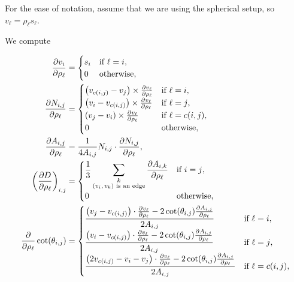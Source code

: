 For the ease of notation, assume that we are using the spherical setup, so \(v_\ell = \rho_\ell s_\ell\).

We compute

\begin{align*}
	\frac{\partial v_i}{\partial \rho_\ell} &= \begin{cases}
		s_i & \text{if \(\ell = i\)}, \\
		0 & \text{otherwise},
	\end{cases} \\
	\frac{\partial N_{i, j}}{\partial \rho_\ell} &= \begin{cases}
		\pof{v_{c\pof{i, j}} - v_j} \times \frac{\partial v_\ell}{\partial \rho_\ell} & \text{if \(\ell = i\)}, \\
		\pof{v_i - v_{c\pof{i, j}}} \times \frac{\partial v_\ell}{\partial \rho_\ell} & \text{if \(\ell = j\)}, \\
		\pof{v_j - v_i} \times \frac{\partial v_\ell}{\partial \rho_\ell} & \text{if \(\ell = c\pof{i, j}\)}, \\
		0 & \text{otherwise},
	\end{cases} \\
	\frac{\partial A_{i, j}}{\partial \rho_\ell} &= \frac{1}{4A_{i, j}}N_{i, j} \cdot \frac{\partial N_{i, j}}{\partial \rho_\ell}, \\
	\pof{\frac{\partial D}{\partial \rho_\ell}}_{i, j} &= \begin{cases}
		\displaystyle\frac{1}{3}\sum_{\substack{k \\ \text{\(\pof{v_i, v_k}\) is an edge}}}\frac{\partial A_{i, k}}{\partial \rho_\ell} & \text{if \(i = j\)}, \\
		0 & \text{otherwise},
	\end{cases} \\
	\frac{\partial}{\partial \rho_\ell}\cot\pof{\theta_{i, j}} &= \begin{cases}
		\displaystyle\frac{\pof{v_j - v_{c\pof{i, j}}} \cdot \frac{\partial v_\ell}{\partial \rho_\ell} - 2\cot\pof{\theta_{i, j}}\frac{\partial A_{i, j}}{\partial \rho_\ell}}{2A_{i, j}} & \text{if \(\ell = i\)}, \\
		\displaystyle\frac{\pof{v_i - v_{c\pof{i, j}}} \cdot \frac{\partial v_\ell}{\partial \rho_\ell} - 2\cot\pof{\theta_{i, j}}\frac{\partial A_{i, j}}{\partial \rho_\ell}}{2A_{i, j}} & \text{if \(\ell = j\)}, \\
		\displaystyle\frac{\pof{2v_{c\pof{i, j}} - v_i - v_j} \cdot \frac{\partial v_\ell}{\partial \rho_\ell} - 2\cot\pof{\theta_{i, j}}\frac{\partial A_{i, j}}{\partial \rho_\ell}}{2A_{i, j}} & \text{if \(\ell = c\pof{i, j}\)}, \\

\end{cases}
\end{align*}
